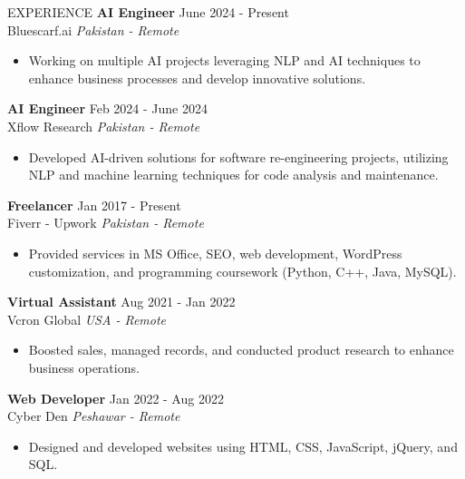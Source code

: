 \documentclass{resume}
\begin{document}
\begin{rSection}{EXPERIENCE}
\textbf{AI Engineer} \hfill June 2024 - Present\\
Bluescarf.ai \hfill \textit{Pakistan - Remote}
\begin{itemize}
    \itemsep -3pt {}
    \item Working on multiple AI projects leveraging NLP and AI techniques to enhance business processes and develop innovative solutions.
\end{itemize}

\textbf{AI Engineer} \hfill Feb 2024 - June 2024\\
Xflow Research \hfill \textit{Pakistan - Remote}
\begin{itemize}
    \itemsep -3pt {}
    \item Developed AI-driven solutions for software re-engineering projects, utilizing NLP and machine learning techniques for code analysis and maintenance.
\end{itemize}

\textbf{Freelancer} \hfill Jan 2017 - Present\\
Fiverr - Upwork \hfill \textit{Pakistan - Remote}
\begin{itemize}
    \itemsep -3pt {}
    \item Provided services in MS Office, SEO, web development, WordPress customization, and programming coursework (Python, C++, Java, MySQL).
\end{itemize}

\textbf{Virtual Assistant} \hfill Aug 2021 - Jan 2022\\
Vcron Global \hfill \textit{USA - Remote}
\begin{itemize}
    \itemsep -3pt {}
    \item Boosted sales, managed records, and conducted product research to enhance business operations.
\end{itemize}

\textbf{Web Developer} \hfill Jan 2022 - Aug 2022\\
Cyber Den \hfill \textit{Peshawar - Remote}
\begin{itemize}
    \itemsep -3pt {}
    \item Designed and developed websites using HTML, CSS, JavaScript, jQuery, and SQL.
\end{itemize}
\end{rSection}

\end{document}
